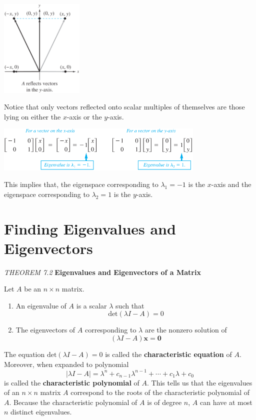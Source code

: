 \documentclass{article}
\begin{document}
    \begin{minipage}{0.28\linewidth}
        \includegraphics[width = 4cm]{images/reflection.png}
    \end{minipage}
    \begin{minipage}{0.67\linewidth}
        Notice that only vectors reflected onto scalar multiples of themselves are those lying on 
        either the $x$-axis or the $y$-axis.
        \begin{center}
            \includegraphics[width = 10cm]{images/reflection2.png}
        \end{center}
        This implies that, the eigenspace corresponding to $\lambda_1 = -1$ is the $x$-axis and the eigenspace corresponding
        to $\lambda_2 = 1$ is the $y$-axis.
    \end{minipage}

    \section{Finding Eigenvalues and Eigenvectors}
    \begin{tcolorbox}[colback = {blue9}]
        \textit{THEOREM 7.2} \textbf{Eigenvalues and Eigenvectors of a Matrix}

        Let $A$ be an $n \times n$ matrix.
        \begin{enumerate}
            \item An eigenvalue of $A$ is a scalar $ \lambda$ such that
                \[\text{det}( \lambda I - A ) = 0\]
            \item The eigenvectors of $A$ corresponding to $ \lambda$ are the nonzero solution of 
                \[( \lambda I - A ) \textbf{x} = \textbf{0}\]
        \end{enumerate}
    \end{tcolorbox}
    The equation $\text{det}(\lambda I - A) = 0$ is called the \textbf{characteristic equation} of $A$. Moreover, when expanded to
    polynomial 
    \[| \lambda I - A | = \lambda^n + c_{n-1} \lambda^{n-1} + \cdots + c_1 \lambda + c_0\]
    is called the \textbf{characteristic polynomial} of $A$. This tells us that the eigenvalues of an $n \times n$ matrix $A$ 
    correspond to the roots of the characteristic polynomial of $A$. Because the characteristic polynomial of $A$
    is of degree $n$, $A$ can have at most $n$ distinct eigenvalues.
\end{document}
